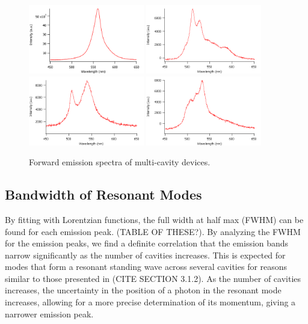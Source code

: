 \documentclass{report}
\begin{document}
        \begin{figure}[h]
            \centering
            \includegraphics[width=0.45\textwidth]{images/n2_fe.png}
            \includegraphics[width=0.45\textwidth]{images/n3_fe.png}
            \newline
            \includegraphics[width=0.45\textwidth]{images/n4_fe.png}
            \includegraphics[width=0.45\textwidth]{images/n5_fe.png}
            \caption{Forward emission spectra of multi-cavity devices.}
        \end{figure}
        
        \subsection{Bandwidth of Resonant Modes}

        By fitting with Lorentzian functions, the full width at half max (FWHM) can be found for each emission peak. (TABLE OF THESE?). By analyzing the FWHM for the emission peaks, we find a definite correlation that the emission bands narrow significantly as the number of cavities increases. This is expected for modes that form a resonant standing wave across several cavities for reasons similar to those presented in (CITE SECTION 3.1.2). As the number of cavities increases, the uncertainty in the position of a photon in the resonant mode increases, allowing for a more precise determination of its momentum, giving a narrower emission peak.
\end{document}
